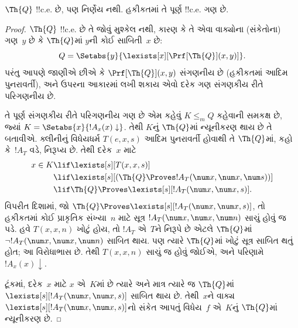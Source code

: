 \documentclass[../../../include/open-logic-section]{subfiles}
\begin{document}



\begin{thm}
$\Th{Q}$ !!{c.e.} છે,
પણ નિર્ણેય નથી. હકીકતમાં તે
પૂર્ણ !!{c.e.} ગણ છે.
\end{thm}

\begin{proof}
$\Th{Q}$ !!{c.e.} છે
તે જોવું મુશ્કેલ નથી, કારણ કે
તે એવા વાક્યોના (સંકેતોના)
ગણ~$y$ છે કે $\Th{Q}$માં
$y$ની કોઈ સાબિતી~$x$ છે:
\[
Q = \Setabs{y}{\lexists[x][\Prf[\Th{Q}](x,y)]}.
\]
પરંતુ આપણે જાણીએ છીએ કે
$\Prf[\Th{Q}](x,y)$ સંગણનીય
છે (હકીકતમાં આદિમ પુનરાવર્તી),
અને ઉપરના આકારમાં લખી શકાય
એવો દરેક ગણ સંગણકીય રીતે
પરિગણનીય છે.

તે પૂર્ણ સંગણકીય રીતે
પરિગણનીય ગણ છે એમ કહેવું
$K \leq_m Q$ કહેવાની સમકક્ષ
છે, જ્યાં $K = \Setabs{x}{!A_x(x) \downarrow}$.
તેથી $K$નું $\Th{Q}$માં
ન્યૂનીકરણ થાય છે તે બતાવીએ.
ક્લીનીનું વિધેયધર્મ
$T(e,x,s)$ આદિમ પુનરાવર્તી
હોવાથી તે $\Th{Q}$માં,
કહો કે~$!A_T$ વડે, નિરૂપ્ય
છે. તેથી દરેક~$x$ માટે
\begin{align*}
x \in K & \lif \lexists[s][T(x,x,s)] \\
& \lif \lexists[s][(\Th{Q} \Proves !A_T(\num x,\num x, \num s))]
  \\
& \lif \Th{Q} \Proves \lexists[s][!A_T(\num x, \num x, s)].
\end{align*}
વિપરીત દિશામાં, જો
$\Th{Q} \Proves \lexists[s][!A_T(\num x, \num x, s)]$,
તો હકીકતમાં કોઈ પ્રાકૃતિક
સંખ્યા~$n$ માટે સૂત્ર
$!A_T(\num x, \num x, \num n)$
સાચું હોવું જ પડે. હવે
$T(x,x,n)$ ખોટું હોય, તો
$!A_T$ એ~$T$ને નિરૂપે છે
એટલે $\Th{Q}$માં
$\lnot !A_T(\num x, \num x, \num n)$
સાબિત થાય. પણ ત્યારે
$\Th{Q}$માં ખોટું સૂત્ર
સાબિત થતું હોત; આ
વિરોધાભાસ છે. તેથી
$T(x,x,n)$ સાચું જ હોવું
જોઈએ, અને પરિણામે
$!A_x(x) \downarrow$.

ટૂંકમાં, દરેક~$x$ માટે
$x$ એ~$K$માં છે ત્યારે અને
માત્ર ત્યારે જ $\Th{Q}$માં
$\lexists[s][!A_T(\num x,\num x,s)]$
સાબિત થાય છે. તેથી~$x$ને
વાક્ય $\lexists[s][!A_T(\num x,
  \num x, s)]$નો સંકેત આપતું
વિધેય~$f$ એ~$K$નું
$\Th{Q}$માં ન્યૂનીકરણ છે.
\end{proof}
\end{document}
